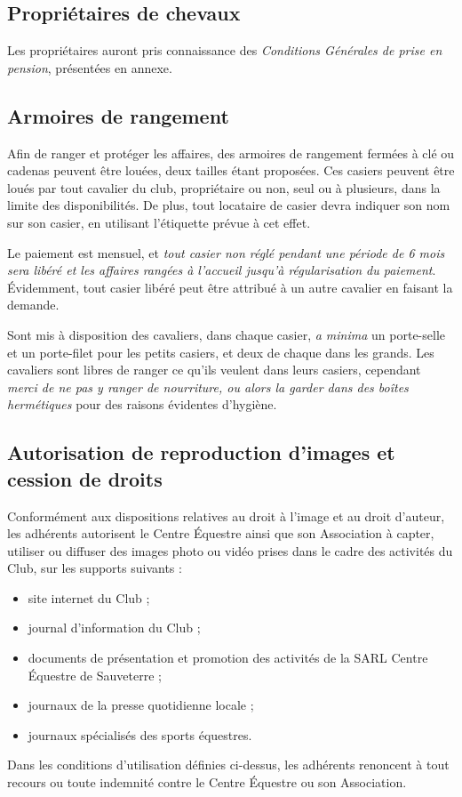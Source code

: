 \documentclass[11pt,a4paper]{article}
\begin{document}
   \subsection{Propriétaires de chevaux}\label{subsec:proprietaires-de-chevaux}
   Les propriétaires auront pris connaissance des \textit{Conditions Générales de prise en pension}, présentées en annexe.

   \subsection{Armoires de rangement}\label{subsec:armoires-de-rangement}
   Afin de ranger et protéger les affaires, des armoires de rangement fermées à clé ou cadenas peuvent être louées, deux tailles étant proposées.
   Ces casiers peuvent être loués par tout cavalier du club, propriétaire ou non, seul ou à plusieurs, dans la limite des disponibilités.
   De plus, tout locataire de casier devra indiquer son nom sur son casier, en utilisant l'étiquette prévue à cet effet.

   Le paiement est mensuel, et \emph{tout casier non réglé pendant une période de 6 mois sera libéré et les affaires rangées à l'accueil jusqu'à régularisation du paiement}.
   Évidemment, tout casier libéré peut être attribué à un autre cavalier en faisant la demande.

   Sont mis à disposition des cavaliers, dans chaque casier, \textit{a minima} un porte-selle et un porte-filet pour les petits casiers, et deux de chaque dans les grands.
   Les cavaliers sont libres de ranger ce qu'ils veulent dans leurs casiers, cependant \emph{merci de ne pas y ranger de nourriture, ou alors la garder dans des boîtes hermétiques} pour des raisons évidentes d'hygiène.

   \subsection{Autorisation de reproduction d'images et cession de droits}\label{subsec:autorisation-de-reproduction-d'images-et-cession-de-droits}
   Conformément aux dispositions relatives au droit à l'image et au droit d'auteur, les adhérents autorisent le Centre Équestre ainsi que son Association à capter, utiliser ou diffuser des images photo ou vidéo prises dans le cadre des activités du Club, sur les supports suivants :
   \begin{itemize}
      \item
      site internet du Club ;
      \item
      journal d'information du Club ;
      \item
      documents de présentation et promotion des activités de la SARL Centre Équestre de Sauveterre ;
      \item
      journaux de la presse quotidienne locale ;
      \item
      journaux spécialisés des sports équestres.
   \end{itemize}
   Dans les conditions d'utilisation définies ci-dessus, les adhérents renoncent à tout recours ou toute indemnité contre le Centre Équestre ou son Association.
\end{document}
